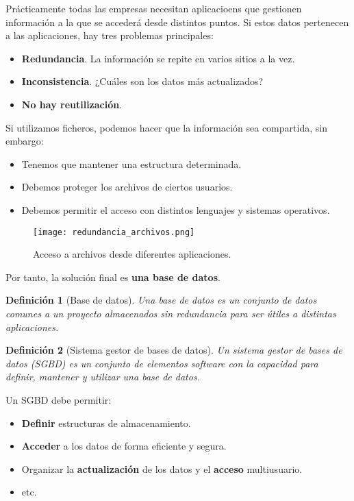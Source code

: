 \documentclass[12pt,spanish]{article}
\newtheorem{definition}{Definición}
\begin{document}
Prácticamente todas las empresas necesitan aplicacioens que gestionen información a la que se accederá desde distintos puntos. Si estos datos pertenecen a las aplicaciones, hay tres problemas principales:
\begin{itemize}
	\item \textbf{Redundancia}. La información se repite en varios sitios a la vez.
	\item \textbf{Inconsistencia}. ¿Cuáles son los datos más actualizados?
	\item \textbf{No hay reutilización}. 
\end{itemize}

Si utilizamos ficheros, podemos hacer que la información sea compartida, sin embargo:
\begin{itemize}
	\item Tenemos que mantener una estructura determinada.
	\item Debemos proteger los archivos de ciertos usuarios.
	\item Debemos permitir el acceso con distintos lenguajes y sistemas operativos.
\end{itemize}

\begin{figure}[H]
\centering
\texttt{[image: redundancia\_archivos.png]}
\caption{Acceso a archivos desde diferentes aplicaciones.}
\end{figure}

Por tanto, la solución final es \textbf{una base de datos}.

\begin{definition}[Base de datos]
Una \emph{base de datos} es un conjunto de datos comunes a un \textit{proyecto} almacenados sin redundancia para ser útiles a distintas aplicaciones.
\end{definition}

\begin{definition}[Sistema gestor de bases de datos]
Un \emph{sistema gestor de bases de datos (SGBD)} es un conjunto de elementos software con la capacidad para definir, mantener y utilizar una base de datos.
\end{definition}

Un SGBD debe permitir:
\begin{itemize}
\item \textbf{Definir} estructuras de almacenamiento.
\item \textbf{Acceder} a los datos de forma eficiente y segura.
\item Organizar la \textbf{actualización} de los datos y el \textbf{acceso} multiusuario.
\item etc.
\end{itemize}
\end{document}
